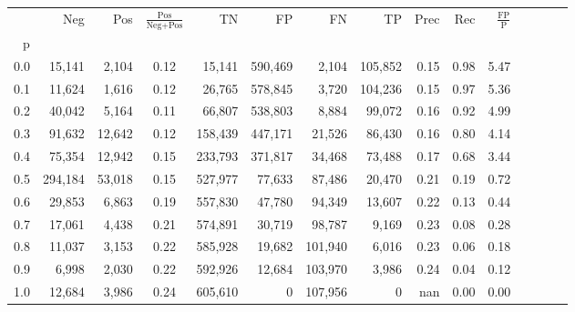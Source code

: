 \begin{tabular}{rrrcrrrrrrrrrrr}
\toprule
{} &      Neg &     Pos & $\frac{\text{Pos}}{\text{Neg}+\text{Pos}}$ &       TN &       FP &       FN &       TP &  Prec &   Rec & $\frac{\text{FP}}{\text{P}}$ \\
p   &          &         &                                            &          &          &          &          &       &       &                              \\
\midrule
0.0 &   15,141 &   2,104 &                                       0.12 &   15,141 &  590,469 &    2,104 &  105,852 &  0.15 &  0.98 &                         5.47 \\
0.1 &   11,624 &   1,616 &                                       0.12 &   26,765 &  578,845 &    3,720 &  104,236 &  0.15 &  0.97 &                         5.36 \\
0.2 &   40,042 &   5,164 &                                       0.11 &   66,807 &  538,803 &    8,884 &   99,072 &  0.16 &  0.92 &                         4.99 \\
0.3 &   91,632 &  12,642 &                                       0.12 &  158,439 &  447,171 &   21,526 &   86,430 &  0.16 &  0.80 &                         4.14 \\
0.4 &   75,354 &  12,942 &                                       0.15 &  233,793 &  371,817 &   34,468 &   73,488 &  0.17 &  0.68 &                         3.44 \\
0.5 &  294,184 &  53,018 &                                       0.15 &  527,977 &   77,633 &   87,486 &   20,470 &  0.21 &  0.19 &                         0.72 \\
0.6 &   29,853 &   6,863 &                                       0.19 &  557,830 &   47,780 &   94,349 &   13,607 &  0.22 &  0.13 &                         0.44 \\
0.7 &   17,061 &   4,438 &                                       0.21 &  574,891 &   30,719 &   98,787 &    9,169 &  0.23 &  0.08 &                         0.28 \\
0.8 &   11,037 &   3,153 &                                       0.22 &  585,928 &   19,682 &  101,940 &    6,016 &  0.23 &  0.06 &                         0.18 \\
0.9 &    6,998 &   2,030 &                                       0.22 &  592,926 &   12,684 &  103,970 &    3,986 &  0.24 &  0.04 &                         0.12 \\
1.0 &   12,684 &   3,986 &                                       0.24 &  605,610 &        0 &  107,956 &        0 &   nan &  0.00 &                         0.00 \\
\bottomrule
\end{tabular}
